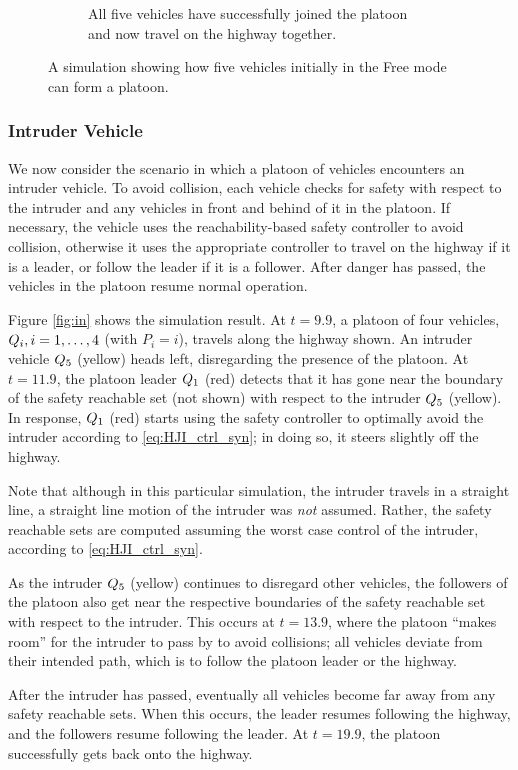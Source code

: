 \begin{figure}
\begin{subfigure}[t]{0.45\textwidth}
        \caption{All five vehicles have successfully joined the platoon and now travel on the highway together.}
    \end{subfigure}   
    \caption{A simulation showing how five vehicles initially in the Free mode can form a platoon. \label{fig:fp}}
\end{figure}

\subsubsection{Intruder Vehicle}
We now consider the scenario in which a platoon of vehicles encounters an intruder vehicle. To avoid collision, each vehicle checks for safety with respect to the intruder and any vehicles in front and behind of it in the platoon. If necessary, the vehicle uses the reachability-based safety controller to avoid collision, otherwise it uses the appropriate controller to travel on the highway if it is a leader, or follow the leader if it is a follower. After danger has passed, the vehicles in the platoon resume normal operation.

Figure \ref{fig:in} shows the simulation result. At $t=9.9$, a platoon of four vehicles, $Q_{i},i=1,\ldots,4$ (with $P_i = i$), travels along the highway shown. An intruder vehicle $Q_{5}$ (yellow) heads left, disregarding the presence of the platoon. At $t=11.9$, the platoon leader $Q_{1}$ (red) detects that it has gone near the boundary of the safety reachable set (not shown) with respect to the intruder $Q_{5}$ (yellow). In response, $Q_{1}$ (red) starts using the safety controller to optimally avoid the intruder according to \eqref{eq:HJI_ctrl_syn}; in doing so, it steers slightly off the highway. 

Note that although in this particular simulation, the intruder travels in a straight line, a straight line motion of the intruder was \textit{not} assumed. Rather, the safety reachable sets are computed assuming the worst case control of the intruder, according to \eqref{eq:HJI_ctrl_syn}.

As the intruder $Q_{5}$ (yellow) continues to disregard other vehicles, the followers of the platoon also get near the respective boundaries of the safety reachable set with respect to the intruder. This occurs at $t=13.9$, where the platoon ``makes room'' for the intruder to pass by to avoid collisions; all vehicles deviate from their intended path, which is to follow the platoon leader or the highway.

After the intruder has passed, eventually all vehicles become far away from any safety reachable sets. When this occurs, the leader resumes following the highway, and the followers resume following the leader. At $t=19.9$, the platoon successfully gets back onto the highway.

